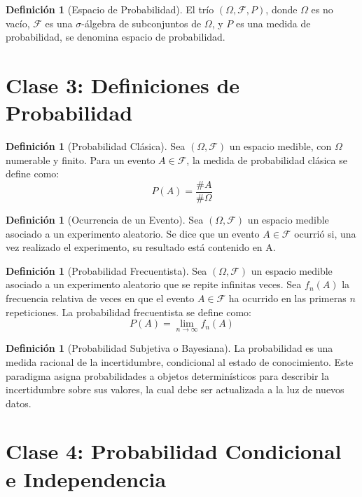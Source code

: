 \documentclass[11pt]{article}
\theoremstyle{definition} %
\newtheorem{definition}[theorem]{Definición}
\begin{document}
\begin{definition}[Espacio de Probabilidad]
El trío $(\Omega, \mathcal{F}, P)$, donde $\Omega$ es no vacío, $\mathcal{F}$ es una $\sigma$-álgebra de subconjuntos de $\Omega$, y $P$ es una medida de probabilidad, se denomina espacio de probabilidad.
\end{definition}


\section{Clase 3: Definiciones de Probabilidad}

\begin{definition}[Probabilidad Clásica]
Sea $(\Omega, \mathcal{F})$ un espacio medible, con $\Omega$ numerable y finito. Para un evento $A \in \mathcal{F}$, la medida de probabilidad clásica se define como:
$$ P(A) = \frac{\#A}{\#\Omega} $$
\end{definition}

\begin{definition}[Ocurrencia de un Evento]
Sea $(\Omega, \mathcal{F})$ un espacio medible asociado a un experimento aleatorio. Se dice que un evento $A \in \mathcal{F}$ ocurrió si, una vez realizado el experimento, su resultado está contenido en A.
\end{definition}

\begin{definition}[Probabilidad Frecuentista]
Sea $(\Omega, \mathcal{F})$ un espacio medible asociado a un experimento aleatorio que se repite infinitas veces. Sea $f_{n}(A)$ la frecuencia relativa de veces en que el evento $A \in \mathcal{F}$ ha ocurrido en las primeras $n$ repeticiones. La probabilidad frecuentista se define como:
$$ P(A) = \lim_{n \to \infty} f_{n}(A) $$
\end{definition}

\begin{definition}[Probabilidad Subjetiva o Bayesiana]
La probabilidad es una medida racional de la incertidumbre, condicional al estado de conocimiento. Este paradigma asigna probabilidades a objetos determinísticos para describir la incertidumbre sobre sus valores, la cual debe ser actualizada a la luz de nuevos datos.
\end{definition}


\section{Clase 4: Probabilidad Condicional e Independencia}
\end{document}
